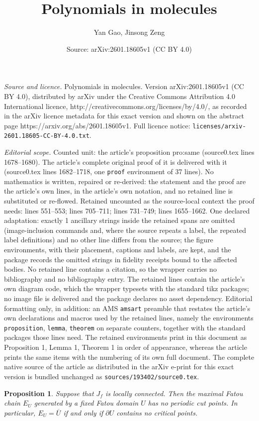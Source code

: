 \documentclass[10pt,a4paper]{amsart}
\title{Polynomials in molecules}
\author{Yan Gao, Jinsong Zeng}
\date{Source: arXiv:2601.18605v1 (CC BY 4.0)}
\newtheorem{proposition}{Proposition}
\begin{document}
\maketitle

\noindent\emph{Source and licence.} Polynomials in molecules. Version arXiv:2601.18605v1 (CC BY 4.0), distributed by arXiv under the Creative Commons Attribution 4.0 International licence, http://creativecommons.org/licenses/by/4.0/, as recorded in the arXiv licence metadata for this exact version and shown on the abstract page https://arxiv.org/abs/2601.18605v1. Full licence notice: \texttt{licenses/arxiv-2601.18605-CC-BY-4.0.txt}.\par\smallskip

\noindent\textit{Editorial scope.} Counted unit: the article's proposition pro:same (source0.tex lines 1678--1680). The article's complete original proof of it is delivered with it (source0.tex lines 1682--1718, one \texttt{proof} environment of 37 lines). No mathematics is written, repaired or re-derived: the statement and the proof are the article's own lines, in the article's own notation, and no retained line is substituted or re-flowed.  Retained uncounted as the source-local context the proof needs: lines 551--553; lines 705--711; lines 731--749; lines 1655--1662.  One declared adaptation: exactly 1 ancillary strings inside the retained spans are omitted (image-inclusion commands and, where the source repeats a label, the repeated label definitions) and no other line differs from the source; the figure environments, with their placement, captions and labels, are kept, and the package records the omitted strings in fidelity receipts bound to the affected bodies.  No retained line contains a citation, so the wrapper carries no bibliography and no bibliography entry.  The retained lines contain the article's own diagram code, which the wrapper typesets with the standard tikz packages; no image file is delivered and the package declares no asset dependency.  Editorial formatting only, in addition: an AMS \texttt{amsart} preamble that restates the article's own declarations and macros used by the retained lines, namely the environments \texttt{proposition}, \texttt{lemma}, \texttt{theorem} on separate counters, together with the standard packages those lines need.  The retained environments print in this document as Proposition 1, Lemma 1, Theorem 1 in order of appearance, whereas the article prints the same items with the numbering of its own full document.  The complete native source of the article as distributed in the arXiv e-print for this exact version is bundled unchanged as \texttt{sources/193402/source0.tex}.
	\begin{proposition}\label{pro:chain1}
		Suppose that $J_f$ is locally connected. Then the maximal Fatou chain $E_U$ generated by a fixed Fatou domain $U$ has no periodic cut points. In particular, $E_U=\overline{U}$ if and only if $\partial U$ contains no critical points.
	\end{proposition}
\end{document}
